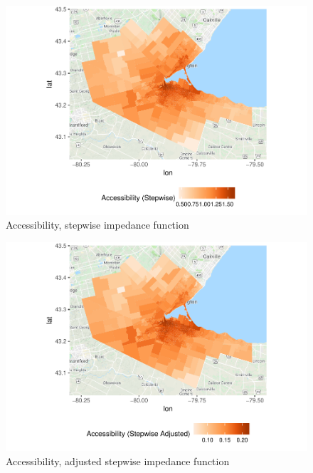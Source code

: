 \documentclass[10pt,letterpaper]{article}
\begin{document}
\begin{figure}
\centering
\includegraphics{Supply_and_Demand_Inflation_in_FCA_Methods_v2.0_files/figure-latex/fig11-map-accessibility-stepwise-1.pdf}
\caption{\label{fig:fig11-map-accessibility-stepwise}Accessibility,
stepwise impedance function}
\end{figure}

\begin{figure}
\centering
\includegraphics{Supply_and_Demand_Inflation_in_FCA_Methods_v2.0_files/figure-latex/fig12-map-accessibility-stepwise-adjusted-1.pdf}
\caption{\label{fig:fig12-map-accessibility-stepwise-adjusted}Accessibility,
adjusted stepwise impedance function}
\end{figure}
\end{document}
